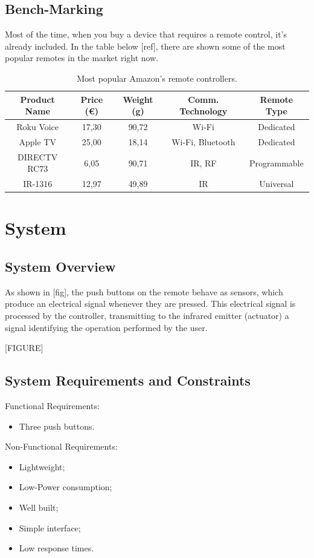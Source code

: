 \documentclass[12pt, letterpaper]{report}
\begin{document}
\subsection{Bench-Marking}
Most of the time, when you buy a device that requires a remote control, it's already included. In the table below [ref], there are shown some of the most popular remotes in the market right now.

\begin{table}[h]
	\centering
	\begin{tabular}{||c c c c c||} 
	\hline
	Product Name & Price (€) & Weight (g) & Comm. Technology & Remote Type\\
	\hline\hline
	Roku Voice & 17,30 & 90,72 & Wi-Fi & Dedicated\\ 
	Apple TV & 25,00 & 18,14 & Wi-Fi, Bluetooth & Dedicated \\
	DIRECTV RC73 & 6,05 & 90,71 & IR, RF & Programmable\\
	IR-1316 & 12,97 & 49,89 & IR & Universal\\
	\hline
\end{tabular}
				
\caption{Most popular Amazon's remote controllers. }
\label{table:popular_remotes}
\end{table}
		
\section{System}
\subsection{System Overview}
As shown in [fig], the push buttons on the remote behave as sensors, which produce an electrical signal whenever they are pressed. This electrical signal is processed by the controller, transmitting to the infrared emitter (actuator) a signal identifying the operation performed by the user. 

[FIGURE]

\subsection{System Requirements and Constraints}

Functional Requirements:
\begin{itemize}
	\item Three push buttons.
\end{itemize}

Non-Functional Requirements:
\begin{itemize}
	\item Lightweight;
	\item Low-Power consumption;
	\item Well built;
	\item Simple interface;
	\item Low response times.
\end{itemize}
\end{document}
